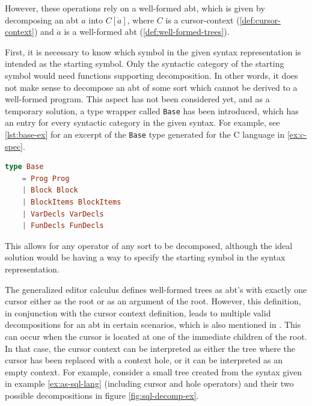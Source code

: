 However, these operations rely on a well-formed abt, which is given
by decomposing an abt $a$ into $C[\dot{a}]$, where $C$ is a
cursor-context (\cref{def:cursor-context}) and $\dot{a}$ is a
well-formed abt (\cref{def:well-formed-trees}).

First, it is necessary to know which symbol in the given syntax representation
is intended as the starting symbol. Only the syntactic category of the starting symbol
would need functions supporting decomposition.
In other words, it does not make sense to decompose an abt of some sort which
cannot be derived to a well-formed program.
This aspect has not been considered yet, and as a temporary solution,
a type wrapper called \texttt{Base} has been introduced, which has an entry for
every syntactic category in the given syntax. For example, see \cref{lst:base-ex}
for an excerpt of the \texttt{Base} type generated for the C language in
\cref{ex:c-spec}.

\begin{lstlisting}[language=elm,style=inline,caption={Example of the Base type},label={lst:base-ex}]
type Base
    = Prog Prog
    | Block Block
    | BlockItems BlockItems
    | VarDecls VarDecls
    | FunDecls FunDecls
\end{lstlisting}

This allows for any operator
of any sort to be decomposed, although the ideal solution would be having
a way to specify the starting symbol in the syntax representation.

The generalized editor calculus\cite{aalborg} defines well-formed trees as abt's
with exactly one cursor either as the root or as an argument of the root.
However, this definition, in conjunction with the cursor context definition,
leads to multiple valid decompositions for an abt in certain scenarios,
which is also mentioned in \cite{aalborg}. This can occur when the cursor is located
at one of the immediate children of the root. In that case, the cursor context
can be interpreted as either the tree where the cursor has been replaced with a
context hole, or it can be interpreted as an empty context.
For example, consider a small tree created from the syntax given in
example \cref{ex:as-sql-lang} (including cursor and hole operators) and
their two possible decompositions in figure \cref{fig:sql-decomp-ex}.


